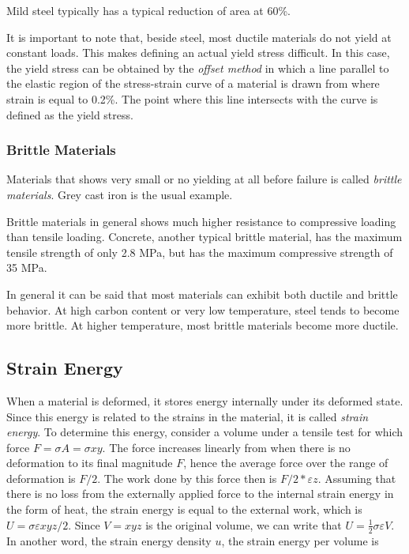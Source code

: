 \documentclass[
fontsize=10pt,
a4paper,
twosides=false,
open=any,
svgnames,
]{kaobook} %
\begin{document}
Mild steel typically has a typical reduction of area at 60\%.

It is important to note that, beside steel, most ductile materials do not yield at constant loads. This makes defining an actual yield stress difficult. In this case, the yield stress can be obtained by the \emph{offset method} in which a line parallel to the elastic region of the stress-strain curve of a material is drawn from where strain is equal to 0.2\%. The point where this line intersects with the curve is defined as the yield stress.


\subsubsection{Brittle Materials}

Materials that shows very small or no yielding at all before failure is called \emph{brittle materials}. Grey cast iron is the usual example.

Brittle materials in general shows much higher resistance to compressive loading than tensile loading. Concrete, another typical brittle material, has the maximum tensile strength of only 2.8 MPa, but has the maximum compressive strength of 35 MPa.

In general it can be said that most materials can exhibit both ductile and brittle behavior. At high carbon content or very low temperature, steel tends to become more brittle. At higher temperature, most brittle materials become more ductile.

\subsection{Strain Energy} \label{subsection: strain energy}

When a material is deformed, it stores energy internally under its deformed state. Since this energy is related to the strains in the material, it is called \emph{strain energy}. To determine this energy, consider a volume under a tensile test for which force $F = \sigma A = \sigma xy$. The force increases linearly from when there is no deformation to its final magnitude $F$, hence the average force over the range of deformation is $F/2$. The work done by this force then is $F/2*\varepsilon z$. Assuming that there is no loss from the externally applied force to the internal strain energy in the form of heat, the strain energy is equal to the external work, which is $U = \sigma\varepsilon xyz/2$. Since $V = xyz$ is the original volume, we can write that $U = \frac{1}{2}\sigma\varepsilon V$. In another word, the strain energy density $u$, the strain energy per volume is
\end{document}
